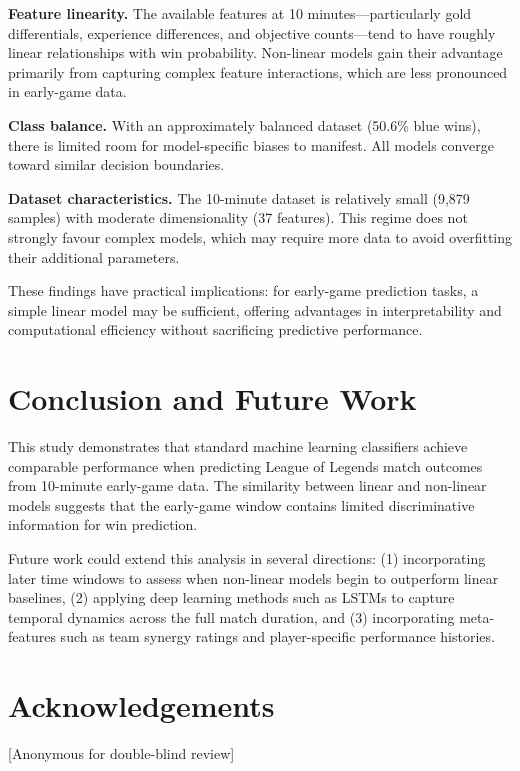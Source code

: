 \documentclass[runningheads]{llncs}
\begin{document}
\textbf{Feature linearity.} The available features at 10 minutes---particularly gold differentials, experience differences, and objective counts---tend to have roughly linear relationships with win probability. Non-linear models gain their advantage primarily from capturing complex feature interactions, which are less pronounced in early-game data.

\textbf{Class balance.} With an approximately balanced dataset (50.6\% blue wins), there is limited room for model-specific biases to manifest. All models converge toward similar decision boundaries.

\textbf{Dataset characteristics.} The 10-minute dataset is relatively small (9,879 samples) with moderate dimensionality (37 features). This regime does not strongly favour complex models, which may require more data to avoid overfitting their additional parameters.

These findings have practical implications: for early-game prediction tasks, a simple linear model may be sufficient, offering advantages in interpretability and computational efficiency without sacrificing predictive performance.

\section{Conclusion and Future Work}
This study demonstrates that standard machine learning classifiers achieve comparable performance when predicting League of Legends match outcomes from 10-minute early-game data. The similarity between linear and non-linear models suggests that the early-game window contains limited discriminative information for win prediction.

Future work could extend this analysis in several directions: (1) incorporating later time windows to assess when non-linear models begin to outperform linear baselines, (2) applying deep learning methods such as LSTMs to capture temporal dynamics across the full match duration, and (3) incorporating meta-features such as team synergy ratings and player-specific performance histories.

\section*{Acknowledgements}
[Anonymous for double-blind review]
\end{document}
